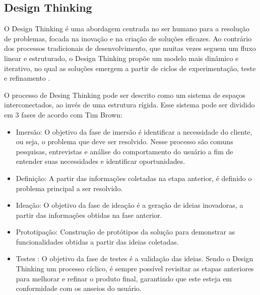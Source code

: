 \subsection{Design Thinking}
O Design Thinking é uma abordagem centrada no ser humano para a resolução de problemas, focada na inovação e na criação de soluções eficazes. Ao contrário dos processos tradicionais de desenvolvimento, que muitas vezes seguem um fluxo linear e estruturado, o Design Thinking propõe um modelo mais dinâmico e iterativo, no qual as soluções emergem a partir de ciclos de experimentação, teste e refinamento \cite{browndesignthinking}.

O processo de Desing Thinking pode ser descrito como um sistema de espaços interconectados, ao invés de uma estrutura rígida. Esse sistema pode ser dividido em 3 fases de acordo com Tim Brown:

\begin{itemize}
    \item Imersão: O objetivo da fase de imersão é identificar a necessidade do cliente, ou seja, o problema que deve ser resolvido. Nesse processo são comuns pesquisas, entrevistas e análise do comportamento do usuário a fim de entender suas necessidades e identificar oportunidades.
    \item Definição: A partir das informações coletadas na etapa anterior, é definido o problema principal a ser resolvido.
    \item Ideação: O objetivo da fase de ideação é a geração de ideias inovadoras, a partir das informações obtidas na fase anterior. 
    \item Prototipação: Construção de protótipos da solução para demonstrar as funcionalidades obtidas a partir das ideias coletadas.
    \item Testes : O objetivo da fase de testes é a validação das ideias. Sendo o Design Thinking um processo cíclico, é sempre possível revisitar as etapas anteriores para melhorar e refinar o produto final, garantindo que este esteja em conformidade com os anseios do usuário.
\end{itemize}


 